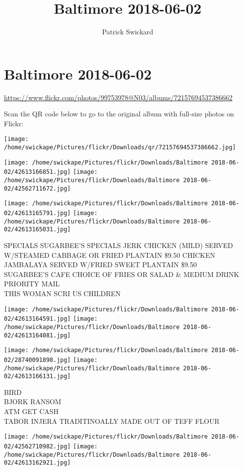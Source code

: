 \documentclass[10pt,letterpaper]{article}
\title{Baltimore 2018-06-02}
\author{Patrick Swickard}
\date{}
\begin{document}
\section*{Baltimore 2018-06-02}

\url{https://www.flickr.com/photos/99753978@N03/albums/72157694537386662}

Scan the QR code below to go to the original album with full-size photos on Flickr:

\texttt{[image: /home/swickape/Pictures/flickr/Downloads/qr/72157694537386662.jpg]}
\pagebreak

\texttt{[image: /home/swickape/Pictures/flickr/Downloads/Baltimore 2018-06-02/42613166851.jpg]}
\texttt{[image: /home/swickape/Pictures/flickr/Downloads/Baltimore 2018-06-02/42562711672.jpg]}

\texttt{[image: /home/swickape/Pictures/flickr/Downloads/Baltimore 2018-06-02/42613165791.jpg]}
\texttt{[image: /home/swickape/Pictures/flickr/Downloads/Baltimore 2018-06-02/42613165031.jpg]}

SPECIALS SUGARBEE'S SPECIALS JERK CHICKEN (MILD) SERVED W/STEAMED CABBAGE OR FRIED PLANTAIN \$9.50 CHICKEN JAMBALAYA SERVED W/FRIED SWEET PLANTAIN \$9.50\\
SUGARBEE'S CAFE CHOICE OF FRIES OR SALAD \& MEDIUM DRINK\\
PRIORITY MAIL\\
THIS WOMAN SCRI US CHILDREN
\pagebreak

\texttt{[image: /home/swickape/Pictures/flickr/Downloads/Baltimore 2018-06-02/42613164591.jpg]}
\texttt{[image: /home/swickape/Pictures/flickr/Downloads/Baltimore 2018-06-02/42613164081.jpg]}

\texttt{[image: /home/swickape/Pictures/flickr/Downloads/Baltimore 2018-06-02/28740091898.jpg]}
\texttt{[image: /home/swickape/Pictures/flickr/Downloads/Baltimore 2018-06-02/42613166131.jpg]}

BIRD\\
BJORK RANSOM\\
ATM GET CASH\\
TABOR INJERA TRADITINOALLY MADE OUT OF TEFF FLOUR
\pagebreak

\texttt{[image: /home/swickape/Pictures/flickr/Downloads/Baltimore 2018-06-02/42562710982.jpg]}
\texttt{[image: /home/swickape/Pictures/flickr/Downloads/Baltimore 2018-06-02/42613162921.jpg]}
\end{document}
